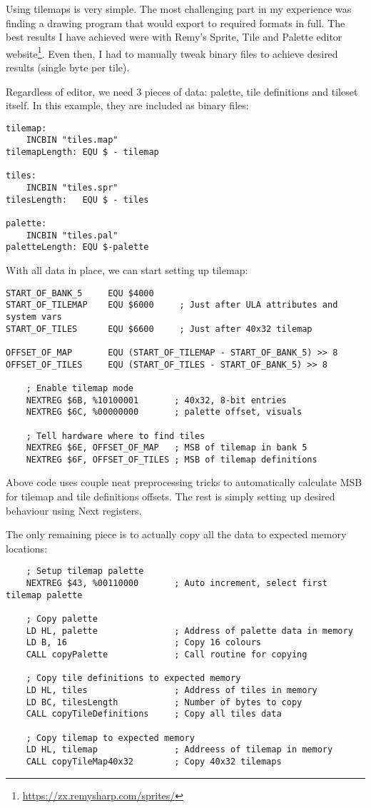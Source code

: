 \documentclass[12pt,twoside,openright,a4paper]{book}
\begin{document}
Using tilemaps is very simple. The most challenging part in my experience was finding a drawing program that would export to required formats in full. The best results I have achieved were with Remy's Sprite, Tile and Palette editor website\footnote{\url{https://zx.remysharp.com/sprites/}}. Even then, I had to manually tweak binary files to achieve desired results (single byte per tile).

Regardless of editor, we need 3 pieces of data: palette, tile definitions and tileset itself. In this example, they are included as binary files:

\begin{lstlisting}
tilemap:
	INCBIN "tiles.map"
tilemapLength: EQU $ - tilemap

tiles:
	INCBIN "tiles.spr"
tilesLength:   EQU $ - tiles

palette:
	INCBIN "tiles.pal"
paletteLength: EQU $-palette
\end{lstlisting}

With all data in place, we can start setting up tilemap:

\begin{lstlisting}
START_OF_BANK_5     EQU $4000
START_OF_TILEMAP    EQU $6000     ; Just after ULA attributes and system vars
START_OF_TILES      EQU $6600     ; Just after 40x32 tilemap

OFFSET_OF_MAP       EQU (START_OF_TILEMAP - START_OF_BANK_5) >> 8
OFFSET_OF_TILES     EQU (START_OF_TILES - START_OF_BANK_5) >> 8

	; Enable tilemap mode
	NEXTREG $6B, %10100001       ; 40x32, 8-bit entries
	NEXTREG $6C, %00000000       ; palette offset, visuals

	; Tell hardware where to find tiles
	NEXTREG $6E, OFFSET_OF_MAP   ; MSB of tilemap in bank 5
	NEXTREG $6F, OFFSET_OF_TILES ; MSB of tilemap definitions
\end{lstlisting}

Above code uses couple neat preprocessing tricks to automatically calculate MSB for tilemap and tile definitions offsets. The rest is simply setting up desired behaviour using Next registers.

\pagebreak
The only remaining piece is to actually copy all the data to expected memory locations:

\begin{lstlisting}
	; Setup tilemap palette
	NEXTREG $43, %00110000       ; Auto increment, select first tilemap palette

	; Copy palette
	LD HL, palette               ; Address of palette data in memory
	LD B, 16                     ; Copy 16 colours
	CALL copyPalette             ; Call routine for copying

	; Copy tile definitions to expected memory
	LD HL, tiles                 ; Address of tiles in memory
	LD BC, tilesLength           ; Number of bytes to copy
	CALL copyTileDefinitions     ; Copy all tiles data

	; Copy tilemap to expected memory
	LD HL, tilemap               ; Addreess of tilemap in memory
	CALL copyTileMap40x32        ; Copy 40x32 tilemaps
\end{lstlisting}
\end{document}
